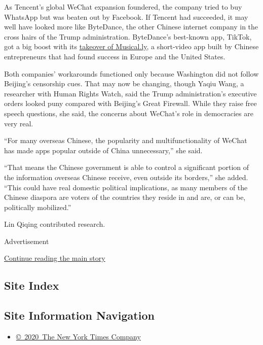 As Tencent's global WeChat expansion foundered, the company tried to buy
WhatsApp but was beaten out by Facebook. If Tencent had succeeded, it
may well have looked more like ByteDance, the other Chinese internet
company in the cross hairs of the Trump administration. ByteDance's
best-known app, TikTok, got a big boost with its
\href{https://www.nytimes.com/2017/11/10/business/dealbook/musically-sold-app-video.html}{takeover
of Musical.ly}, a short-video app built by Chinese entrepreneurs that
had found success in Europe and the United States.

Both companies' workarounds functioned only because Washington did not
follow Beijing's censorship cues. That may now be changing, though Yaqiu
Wang, a researcher with Human Rights Watch, said the Trump
administration's executive orders looked puny compared with Beijing's
Great Firewall. While they raise free speech questions, she said, the
concerns about WeChat's role in democracies are very real.

``For many overseas Chinese, the popularity and multifunctionality of
WeChat has made apps popular outside of China unnecessary,'' she said.

``That means the Chinese government is able to control a significant
portion of the information overseas Chinese receive, even outside its
borders,'' she added. ``This could have real domestic political
implications, as many members of the Chinese diaspora are voters of the
countries they reside in and are, or can be, politically mobilized.''

Lin Qiqing contributed research.

Advertisement

\protect\hyperlink{after-bottom}{Continue reading the main story}

\hypertarget{site-index}{%
\subsection{Site Index}\label{site-index}}

\hypertarget{site-information-navigation}{%
\subsection{Site Information
Navigation}\label{site-information-navigation}}

\begin{itemize}
\tightlist
\item
  \href{https://help.nytimes.com/hc/en-us/articles/115014792127-Copyright-notice}{©~2020~The
  New York Times Company}
\end{itemize}

